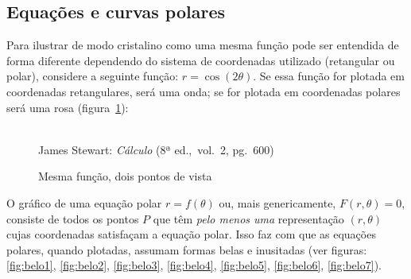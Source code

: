\subsection{Equações e curvas polares}
\label{sec:coordpolar-eqcurv}

Para ilustrar de modo cristalino como uma mesma função pode ser
entendida de forma diferente dependendo do sistema de coordenadas
utilizado (retangular ou polar), considere a seguinte função: $r =
\cos(2\theta)$. Se essa função for plotada em coordenadas
retangulares, será uma onda; se for plotada em coordenadas polares
será uma rosa (figura~\ref{fig:mesmafuncdifview}):

\begin{figure}[H]
    \begin{center}
      \caption{Mesma função, dois pontos de vista}
      \label{fig:mesmafuncdifview}
      \\
      \footnotesize{James Stewart: \emph{Cálculo} (8ª ed.,\ vol.\ 2, pg.\ 600)}
    \end{center}
\end{figure}

O gráfico de uma equação polar $r = f(\theta)$ ou, mais genericamente,
$F(r,\theta)=0$, consiste de todos os pontos $P$ que têm \emph{pelo
  menos uma} representação $(r, \theta)$ cujas coordenadas satisfaçam
a equação polar. Isso faz com que as equações polares, quando
plotadas, assumam formas belas e inusitadas (ver figuras:
\ref{fig:belo1}, \ref{fig:belo2}, \ref{fig:belo3}, \ref{fig:belo4},
\ref{fig:belo5}, \ref{fig:belo6}, \ref{fig:belo7}).

